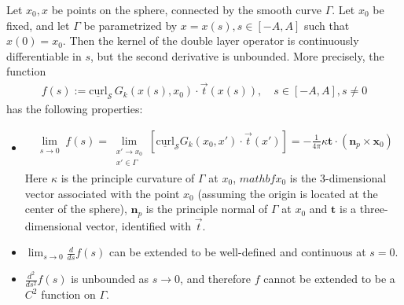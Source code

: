 \documentclass[final]{siamltex}
\renewcommand{\S} {\mathcal{S}}
\begin{document}
\begin{lemma}
\label{regularity}
Let $x_0,x$ be points on the sphere, connected by the smooth curve
$\Gamma$. Let $x_0$ be fixed, and let $\Gamma$ be parametrized by
$x=x(s), s\in[-A,A]$ such that $x(0)=x_{0}$. Then the kernel of the double layer operator is continuously differentiable in $s$, but the second derivative is unbounded. More precisely, 
the function 
\begin{align*}
  f(s):=\underline{\mbox{curl}}_{\S}\,
    G_k(x(s),x_0)\cdot\vec{t}(x(s)), \quad s\in[-A,A], s \neq 0
\end{align*}
has the following properties:
\begin{itemize}
\item \begin{align*} \lim_{\substack {s \rightarrow 0}} f(s) = 
      \lim_{\substack {x' \rightarrow x_{0} \\ x' \in \Gamma}}
        [\underline{\mbox{curl}}_{\S}G_{k}(x_{0},x') \cdot \vec{t}(x')] =  
        -\frac{1}{4\pi} \kappa \mathbf{t}\cdot(\mathbf{n}_p\times \mathbf{x}_0)
    \end{align*}
Here $\kappa$ is the principle curvature of $\Gamma$ at $x_0$, $mathbf{x}_0$ is the 3-dimensional vector associated with the point $x_0$ (assuming the origin is located at the center of the sphere), $\mathbf{n}_p$ is the principle normal of $\Gamma$ at $x_0$ and $\mathbf{t}$ is a three-dimensional vector, identified with $\vec{t}$. 
\item $\lim_{s\rightarrow 0} \frac{d}{ds}f(s)$ can be extended to be well-defined and continuous at
$s=0$. 
\item $ \frac{d^2}{ds^2} f(s)$ is unbounded as $s\rightarrow 0$, and therefore $f$ cannot be extended to be a $C^2$ function on $\Gamma$.

\end{itemize}
\end{lemma}
\end{document}
